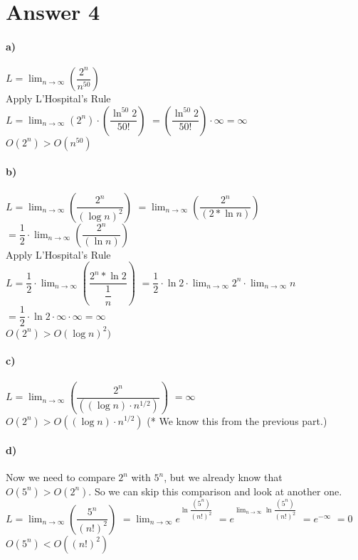 \documentclass[12pt]{article}
\begin{document}
\section*{Answer 4}
\paragraph{a)} %
$L = \lim_{n \rightarrow \infty} (\dfrac{2^n}{n^{50}})$\\
Apply L'Hospital's Rule\\
$L = \lim_{n \rightarrow \infty} (2^n) \cdot (\dfrac{\ln^{50}{2}}{50!})$
$= (\dfrac{\ln^{50}{2}}{50!}) \cdot \infty = \infty$\\
$O(2^n) > O(n^{50})$


\paragraph{b)} %
$L = \lim_{n \rightarrow \infty} (\dfrac{2^n}{(\log{n})^2})$
$= \lim_{n \rightarrow \infty} (\dfrac{2^n}{(2*\ln{n})})$
$= \dfrac{1}{2} \cdot \lim_{n \rightarrow \infty} (\dfrac{2^n}{(\ln{n})})$\\
Apply L'Hospital's Rule\\
$L = \dfrac{1}{2} \cdot \lim_{n \rightarrow \infty} (\dfrac{2^n * \ln{2}}{ \dfrac{1}{n}})$
$= \dfrac{1}{2} \cdot \ln{2} \cdot \lim_{n \rightarrow \infty} {2^n} \cdot \lim_{n \rightarrow \infty} {n}$
$= \dfrac{1}{2} \cdot \ln{2}\cdot \infty \cdot \infty = \infty$\\
$O(2^n) > O(\log{n})^2)$


\paragraph{c)}
$L = \lim_{n \rightarrow \infty} (\dfrac{2^n}{((\log{n})\cdot n^{1/2})})$
$= \infty$\\
$O(2^n) > O((\log{n})\cdot n^{1/2})$
(* We know this from the previous part.)

\paragraph{d)}
Now we need to compare $2^n$ with $5^n$, but we already know that $O(5^n) > O(2^n).$ So we can skip this comparison and look at another one.\\
$L = \lim_{n \rightarrow \infty} (\dfrac{5^n}{(n!)^2})$
$= \lim_{n \rightarrow \infty} e^{\ln{\dfrac{(5^n)}{(n!)^2}}}$
$= e^{\lim_{n \rightarrow \infty} \ln{\dfrac{(5^n)}{(n!)^2}}}$
$= e^{- \infty}$
$= 0$\\
$O(5^n) < O((n!)^2)$
\end{document}

